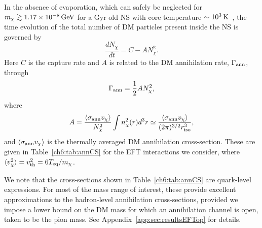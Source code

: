 In the absence of evaporation, which can safely be neglected for $m_\chi \gtrsim 1.17\times 10^{-8}{\rm \,GeV}$ for a Gyr old NS with core temperature $\sim 10^3{\rm \,K}$~\cite{Bell:2020lmm_mar_ImprovedTreatmentDark}, the time evolution of the total number of DM particles present inside the NS is governed by
\begin{equation}
    \frac{dN_\chi}{dt} = C - A N_\chi^2 \label{ch6:eq:ndm}.
\end{equation}
Here $C$ is the capture rate and  $A$ is related to the DM annihilation rate, $\Gamma_{\rm ann}$, through
\begin{equation}
    \Gamma_{\rm ann} =  \frac{1}{2}A N_\chi^2,
\end{equation}
where
\begin{equation}
    A = \frac{\langle \sigma_\text{ann}v_\chi \rangle}{N_\chi^2} \int n_\chi^2(r) d^3 r \simeq \frac{\langle \sigma_\text{ann} v_\chi\rangle}{(2\pi)^{3/2} r_{\rm iso}^3}, \label{ch6:eq:annrate}
\end{equation}
and $\langle \sigma_{\rm ann} v_\chi \rangle$ is the
thermally averaged DM annihilation cross-section. These are given in Table~\ref{ch6:tab:annCS} for the EFT interactions we consider, where $\langle v^2_\chi \rangle = v_{\rm th}^2 =  6 T_{\rm eq}/ m_\chi$.


We note that the cross-sections shown in Table~\ref{ch6:tab:annCS} are quark-level expressions. For most of the mass range of interest, these provide excellent approximations to the hadron-level annihilation cross-sections, provided we impose a lower bound on the DM mass for which an annihilation channel is open, taken to be the pion mass. See Appendix~\ref{app:sec:resultsEFTop} for details.




